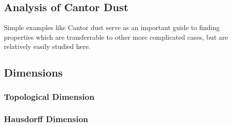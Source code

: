 \subsection{Analysis of Cantor Dust}
Simple examples like Cantor dust serve as an important guide to finding
properties which are transferrable to other more complicated cases, but are
relatively easily studied here.

\subsection{Dimensions}
\subsubsection{Topological Dimension}
\subsubsection{Hausdorff Dimension}
